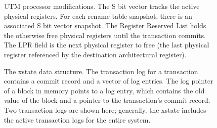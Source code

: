 




\begin{figure}[b]
\hspace{-0.15cm}

\caption[UTM processor modifications.]%
{UTM processor modifications. The S bit vector
tracks the active physical registers.  For each rename table snapshot,
there is an associated S bit vector snapshot.  The Register Reserved
List holds the otherwise free physical registers until the transaction
commits.  The LPR field is the next physical register to free (the
last physical register referenced by the destination architectural
register).}
\label{fig:snapshot-utm}
\end{figure}
\begin{figure}[b]
\hspace{-1.3cm} %

\caption[The xstate data structure.]{The xstate data structure.
The transaction log for a transaction contains a commit record and a
vector of log entries.  The log pointer of a block in memory
points to a log entry, which contains the old value of the block and a
pointer to the transaction's commit record.  Two transaction logs
are shown here; generally, the xstate includes the active
transaction logs for the entire system.}
\label{fig:datastruct-entry}
\end{figure}

